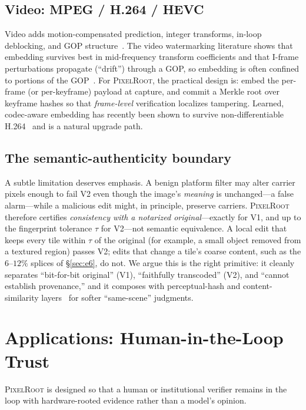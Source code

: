 \documentclass[journal]{IEEEtran}
\newcommand{\pr}{\textup{\textsc{PixelRoot}}}
\begin{document}
\subsection{Video: MPEG / H.264 / HEVC}
Video adds motion-compensated prediction, integer transforms, in-loop
deblocking, and GOP structure~\cite{wiegand2003h264,sullivan2012hevc}. The video
watermarking literature shows that embedding survives best in mid-frequency
transform coefficients and that I-frame perturbations propagate (``drift'')
through a GOP, so embedding is often confined to portions of the
GOP~\cite{videowatermark2018survey,hevcwatermark2020,cstfmark2026}. For \pr{},
the practical design is: embed the per-frame (or per-keyframe) payload at
capture, and commit a Merkle root over keyframe hashes so that
\emph{frame-level} verification localizes tampering. Learned, codec-aware
embedding has recently been shown to survive non-differentiable
\mbox{H.264}~\cite{cstfmark2026} and is a natural upgrade path.

\subsection{The semantic-authenticity boundary}\label{sec:semantic}
A subtle limitation deserves emphasis. A benign platform filter may alter
carrier pixels enough to fail V2 even though the image's \emph{meaning} is
unchanged---a false alarm---while a malicious edit might, in principle, preserve
carriers. \pr{} therefore certifies \emph{consistency with a notarized original}---exactly
for V1, and up to the fingerprint tolerance $\tau$ for V2---not semantic
equivalence. A local edit that keeps every tile within $\tau$ of the original
(for example, a small object removed from a textured region) passes V2; edits that
change a tile's coarse content, such as the $6$--$12\%$ splices of
\S\ref{sec:e6}, do not. We argue this is the right primitive: it cleanly separates ``bit-for-bit original'' (V1), ``faithfully
transcoded'' (V2), and ``cannot establish provenance,'' and it composes with
perceptual-hash and content-similarity layers~\cite{videowmblockchain2024} for
softer ``same-scene'' judgments.

\ifshort
\else
\section{Applications: Human-in-the-Loop Trust}\label{sec:apps}

\pr{} is designed so that a human or institutional verifier remains in the loop
with hardware-rooted evidence rather than a model's opinion.
\end{document}
